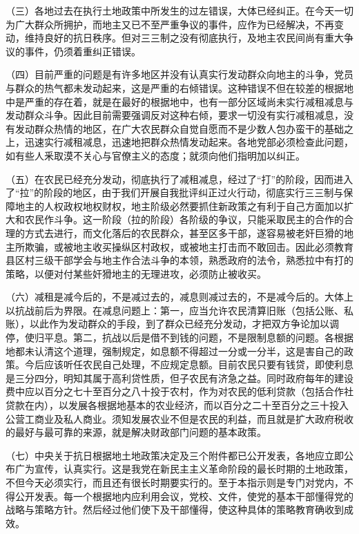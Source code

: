 （三）各地过去在执行土地政策中所发生的过左错误，大体已经纠正。在今天一切为广大群众所拥护，而地主又已不至严重争议的事件，应作为已经解决，不再变动，维持良好的抗日秩序。但对三三制之没有彻底执行，及地主农民间尚有重大争议的事件，仍须着重纠正错误。

（四）目前严重的问题是有许多地区并没有认真实行发动群众向地主的斗争，党员与群众的热气都未发动起来，这是严重的右倾错误。这种错误不但在较差的根据地中是严重的存在着，就是在最好的根据地中，也有一部分区域尚未实行减租减息与发动群众斗争。因此目前需要强调反对这种右倾，要求一切没有实行减租减息，没有发动群众热情的地区，在广大农民群众自觉自愿而不是少数人包办蛮干的基础之上，迅速实行减租减息，迅速地把群众热情发动起来。各地党部必须检查此问题，如有些人釆取漠不关心与官僚主义的态度；就须向他们指明加以纠正。

（五）在农民已经充分发动，彻底执行了减租减息，经过了“打”的阶段，因而进入了“拉”的阶段的地区，由于我们开展自我批评纠正过火行动，彻底实行三三制与保障地主的人权政权地权财权，地主阶级必然要抓住新政策之有利于自己方面加以扩大和农民作斗争。这一阶段（拉的阶段）各阶级的争议，只能采取民主的合作的合理的方式去进行，而文化落后的农民群众，甚至区多干部，遂容易被老奸巨猾的地主所欺骗，或被地主收买操纵区村政权，或被地主打击而不敢回击。因此必须教育县区村三级干部学会与地主作合法斗争的本领，熟悉政府的法令，熟悉拉中有打的策略，以便对付某些奸猾地主的无理进攻，必须防止被收买。


（六）减租是减今后的，不是减过去的，减息则减过去的，不是减今后的。大体上以抗战前后为界限。在减息问题上：第一，应当允许农民清算旧账（包括公账、私账），以此作为发动群众的手段，到了群众已经充分发动，才把双方争论加以调停，使归平息。第二，抗战以后是借不到钱的问题，不是限制息额的问题。各根据地都未认清这个道理，强制规定，如息额不得超过一分或一分半，这是害自己的政策。今后应该听任农民自己处理，不应规定息额。目前农民只要有钱贷，即使利息是三分四分，明知其属于高利贷性质，但子农民有济急之益。同时政府每年的建设费中应以百分之七十至百分之八十投于农村，作为对农民的低利贷款（包括合作社贷款在内），以发展各根据地基本的农业经济，而以百分之二十至百分之三十投入公营工商业及私人商业。须知发展农业不但是农民的利益，而且就是扩大政府税收的最好与最可靠的来源，就是解决财政部门问题的基本政策。

（七）中央关于抗日根据地土地政策决定及三个附件都已公开发表，各地应立即公布广为宣传，认真实行。这是我党在新民主主义革命阶段的最长时期的土地政策，不但今天必须实行，而且还有很长时期要实行的。至于本指示则是专门对党内，不得公开发表。每一个根据地内应利用会议，党校、文件，使党的基本干部懂得党的战略与策略方针。然后经过他们使下及干部懂得，使这种具体的策略教育确收到成效。

